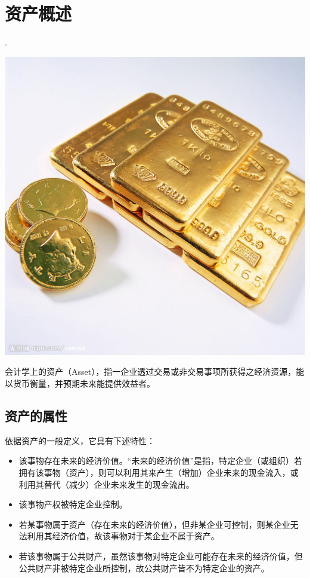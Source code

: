 \section {资产概述}

.
    \begin{center}
        \includegraphics[scale=0.2] {gold.jpg}
    \end{center}

    会计学上的资产（Asset），指一企业透过交易或非交易事项所获得之经济资源，能以货币衡量，并预期未来能提供效益者。

\subsection {资产的属性}

    依据资产的一般定义，它具有下述特性：
    \begin{itemize}
        \item  该事物存在未来的经济价值。“未来的经济价值”是指，特定企业（或组织）若拥有该事物（资产），则可以利用其来产生（增加）企业未来的现金流入，或利用其替代（减少）企业未来发生的现金流出。
        \item  该事物产权被特定企业控制。
        \item  若某事物属于资产（存在未来的经济价值），但非某企业可控制，则某企业无法利用其经济价值，故该事物对于某企业不属于资产。
        \item  若该事物属于公共财产，虽然该事物对特定企业可能存在未来的经济价值，但公共财产非被特定企业所控制，故公共财产皆不为特定企业的资产。
    \end{itemize}

